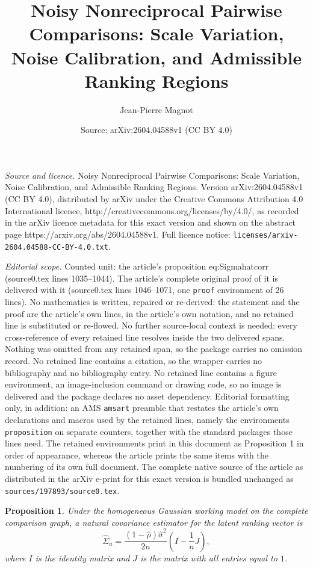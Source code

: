 \documentclass[10pt,a4paper]{amsart}
\title{Noisy Nonreciprocal Pairwise Comparisons: Scale Variation, Noise Calibration, and Admissible Ranking Regions}
\author{Jean-Pierre Magnot}
\date{Source: arXiv:2604.04588v1 (CC BY 4.0)}
\newtheorem{proposition}{Proposition}
\begin{document}
\maketitle

\noindent\emph{Source and licence.} Noisy Nonreciprocal Pairwise Comparisons: Scale Variation, Noise Calibration, and Admissible Ranking Regions. Version arXiv:2604.04588v1 (CC BY 4.0), distributed by arXiv under the Creative Commons Attribution 4.0 International licence, http://creativecommons.org/licenses/by/4.0/, as recorded in the arXiv licence metadata for this exact version and shown on the abstract page https://arxiv.org/abs/2604.04588v1. Full licence notice: \texttt{licenses/arxiv-2604.04588-CC-BY-4.0.txt}.\par\smallskip

\noindent\textit{Editorial scope.} Counted unit: the article's proposition eq:Sigmahatcorr (source0.tex lines 1035--1044). The article's complete original proof of it is delivered with it (source0.tex lines 1046--1071, one \texttt{proof} environment of 26 lines). No mathematics is written, repaired or re-derived: the statement and the proof are the article's own lines, in the article's own notation, and no retained line is substituted or re-flowed.  No further source-local context is needed: every cross-reference of every retained line resolves inside the two delivered spans.  Nothing was omitted from any retained span, so the package carries no omission record.  No retained line contains a citation, so the wrapper carries no bibliography and no bibliography entry.  No retained line contains a figure environment, an image-inclusion command or drawing code, so no image is delivered and the package declares no asset dependency.  Editorial formatting only, in addition: an AMS \texttt{amsart} preamble that restates the article's own declarations and macros used by the retained lines, namely the environments \texttt{proposition} on separate counters, together with the standard packages those lines need.  The retained environments print in this document as Proposition 1 in order of appearance, whereas the article prints the same items with the numbering of its own full document.  The complete native source of the article as distributed in the arXiv e-print for this exact version is bundled unchanged as \texttt{sources/197893/source0.tex}.
\begin{proposition}
Under the homogeneous Gaussian working model on the complete comparison graph, a natural covariance estimator for the latent ranking vector is
\begin{equation}\label{eq:Sigmahatcorr}
\widehat\Sigma_u
=
\frac{(1-\widehat\rho)\widehat\sigma^2}{2n}
\left(I-\frac1nJ\right),
\end{equation}
where $I$ is the identity matrix and $J$ is the matrix with all entries equal to $1$.
\end{proposition}
\end{document}
